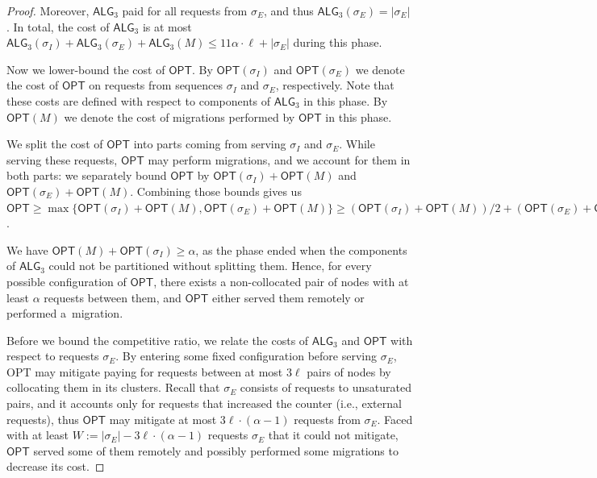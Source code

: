 \documentclass[a4paper,anonymous,USenglish]{lipics-v2019}
\newcommand{\OPT}{\textsf{OPT}\xspace}
\newcommand{\TAlg}{{\ensuremath{\textsf{ALG}_{3}}}\xspace}
\newcommand\maciek[1]{\color{brown}\textbf{(Maciek: #1)}\color{black}}
\begin{document}
\begin{proof}
	
	Moreover, \TAlg paid for all requests from $\sigma_E$, and thus $\TAlg(\sigma_E) = |\sigma_E|$.
	In total, the cost of \TAlg is at most $\TAlg(\sigma_I) + \TAlg(\sigma_E) + \TAlg(M) \leq 11\alpha\cdot \ell + |\sigma_E|$ during this phase.
	
	\medskip
	
	Now we lower-bound the cost of $\OPT$.
	By $\OPT(\sigma_I)$ and $\OPT(\sigma_E)$ we denote the cost of $\OPT$ on requests from sequences $\sigma_I$ and $\sigma_E$, respectively.
	Note that these costs are defined with respect to components of \TAlg in this phase.
	By $\OPT(M)$ we denote the cost of migrations performed by $\OPT$ in this phase.
	
	We split the cost of $\OPT$ into parts coming from serving $\sigma_I$ and $\sigma_E$.
	While serving these requests, $\OPT$ may perform migrations, and we account for them in both parts: we separately bound $\OPT$ by $\OPT(\sigma_I) + \OPT(M)$ and $\OPT(\sigma_E) + \OPT(M)$.
	Combining those bounds gives us $\OPT \geq \max\{\OPT(\sigma_I) + \OPT(M), \OPT(\sigma_E) + \OPT(M)\} \geq (\OPT(\sigma_I) + \OPT(M)) / 2 + (\OPT(\sigma_E) + \OPT(M)) / 2$.
	
	
	We have $\OPT(M) + \OPT(\sigma_I) \geq \alpha$, as the phase ended when the components of \TAlg{} could not be partitioned without splitting them.
	Hence, for every possible configuration of $\OPT$, there exists a non-collocated pair of nodes with at least $\alpha$ requests between them, and
	$\OPT$ either served them remotely or performed a~migration.
	
	\medskip
	Before we bound the competitive ratio, we relate the costs of $\TAlg$ and $\OPT$ with respect to requests $\sigma_E$.
	By entering some fixed configuration before serving $\sigma_E$, \OPT may mitigate paying for requests between at most $3\ell$ pairs of nodes by collocating them in its clusters.
	Recall that $\sigma_E$ consists of requests to unsaturated pairs, and it accounts only for requests that increased the counter (i.e., external requests), thus $\OPT$ may mitigate at most $3\ell\cdot(\alpha - 1)$ requests from $\sigma_E$.
	Faced with at least $W := |\sigma_E| - 3\ell\cdot(\alpha-1)$ requests $\sigma_E$ that it could not mitigate, $\OPT$ served some of them remotely and possibly performed some migrations to decrease its cost.
	

\end{proof}
\end{document}
